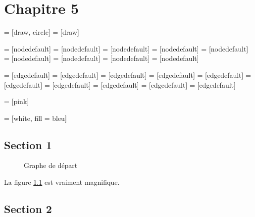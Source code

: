 
\chapter{Chapitre 5}

\chaptoc

 = [draw, circle]
 = [draw]

 = [nodedefault]
 = [nodedefault]
 = [nodedefault]
 = [nodedefault]
 = [nodedefault]
 = [nodedefault]
 = [nodedefault]
 = [nodedefault]
 = [nodedefault]

 = [edgedefault]
 = [edgedefault]
 = [edgedefault]
 = [edgedefault]
 = [edgedefault]
 = [edgedefault]
 = [edgedefault]
 = [edgedefault]
 = [edgedefault]
 = [edgedefault]

 = [pink]

 = [white, fill = bleu]

\section{Section 1}

\begin{figure}
  \centering
    
  \begin{tikzpicture}[every node/.style = {nodedefault}, every path/.style = {edgedefault}] 
    
  \end{tikzpicture}
    
  \caption{Graphe de départ}
  \label{fig:graphe}
\end{figure}

La figure \ref{fig:graphe} est vraiment magnifique.

\section{Section 2}

